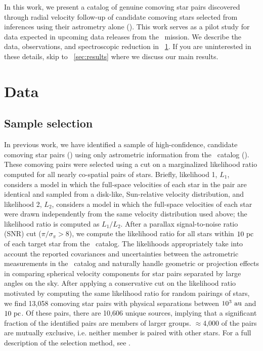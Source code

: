 \documentclass[modern, letterpaper]{aastex61}
\newcommand{\gaia}{\project{Gaia}}
\newcommand{\tgas}{\acronym{TGAS}}
\begin{document}
In this work, we present a catalog of genuine comoving star pairs discovered
through radial velocity follow-up of candidate comoving stars selected from
inferences using their astrometry alone (\citealt{Oh:2017}).
This work serves as a pilot study for data expected in upcoming data releases
from the \gaia\ mission.
We describe the data, observations, and spectroscopic reduction in
\sectionname~\ref{sec:data}.
If you are uninterested in these details, skip to \sectionname~\ref{sec:results}
where we discuss our main results.

\section{Data}\label{sec:data}

\subsection{Sample selection}\label{sec:sample}

In previous work, we have identified a sample of high-confidence, candidate
comoving star pairs (\citealt{Oh:2017}) using only astrometric information from
the \tgas\ catalog (\citealt{tgas}).
These comoving pairs were selected using a cut on a marginalized likelihood
ratio computed for all nearly co-spatial pairs of stars.
Briefly, likelihood 1, $L_1$, considers a model in which the full-space
velocities of each star in the pair are identical and sampled from a disk-like,
Sun-relative velocity distribution, and likelihood 2, $L_2$, considers a model
in which the full-space velocities of each star were drawn independently from
the same velocity distribution used above; the likelihood ratio is computed as
$L_1/L_2$.
After a parallax signal-to-noise ratio (SNR) cut ($\pi/\sigma_\pi > 8$), we
compute the likelihood ratio for all stars within $10~\mathrm{pc}$ of each target star
from the \tgas\ catalog.
The likelihoods appropriately take into account the reported covariances and
uncertainties between the astrometric measurements in the \tgas\ catalog and
naturally handle geometric or projection effects in comparing spherical
velocity components for star pairs separated by large angles on the sky.
After applying a conservative cut on the likelihood ratio motivated by
computing the same likelihood ratio for random pairings of stars, we find
13,058 comoving star pairs with physical separations between $10^3~\mathrm{au}$ and
$10~\mathrm{pc}$.
Of these pairs, there are 10,606 unique sources, implying that a significant
fraction of the identified pairs are members of larger groups.
$\approx$4,000 of the pairs are mutually exclusive, i.e. neither member is
paired with other stars.
For a full description of the selection method, see \citealt{Oh:2017}.
\end{document}
